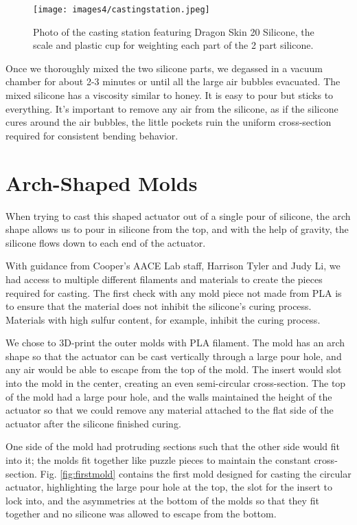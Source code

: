 \begin{figure}[ht]
    \centering
    \texttt{[image: images4/castingstation.jpeg]}
    \caption{Photo of the casting station featuring Dragon Skin 20 Silicone, the scale and plastic cup for weighting each part of the 2 part silicone.}
    \label{fig:castingstation}
\end{figure}

Once we thoroughly mixed the two silicone parts, we degassed in a vacuum chamber for about 2-3 minutes or until all the large air bubbles evacuated. The mixed silicone has a viscosity similar to honey. It is easy to pour but sticks to everything. It's important to remove any air from the silicone, as if the silicone cures around the air bubbles, the little pockets ruin the uniform cross-section required for consistent bending behavior. 

\clearpage
\section{Arch-Shaped Molds}
When trying to cast this shaped actuator out of a single pour of silicone, the arch shape allows us to pour in silicone from the top, and with the help of gravity, the silicone flows down to each end of the actuator. 

With guidance from Cooper's AACE Lab staff, Harrison Tyler and Judy Li, we had access to multiple different filaments and materials to create the pieces required for casting. The first check with any mold piece not made from PLA is to ensure that the material does not inhibit the silicone's curing process. Materials with high sulfur content, for example, inhibit the curing process. 

We chose to 3D-print the outer molds with PLA filament. The mold has an arch shape so that the actuator can be cast vertically through a large pour hole, and any air would be able to escape from the top of the mold. The insert would slot into the mold in the center, creating an even semi-circular cross-section. The top of the mold had a large pour hole, and the walls maintained the height of the actuator so that we could remove any material attached to the flat side of the actuator after the silicone finished curing. 

One side of the mold had protruding sections such that the other side would fit into it; the molds fit together like puzzle pieces to maintain the constant cross-section. Fig. \ref{fig:firstmold} contains the first mold designed for casting the circular actuator, highlighting the large pour hole at the top, the slot for the insert to lock into, and the asymmetries at the bottom of the molds so that they fit together and no silicone was allowed to escape from the bottom. 

